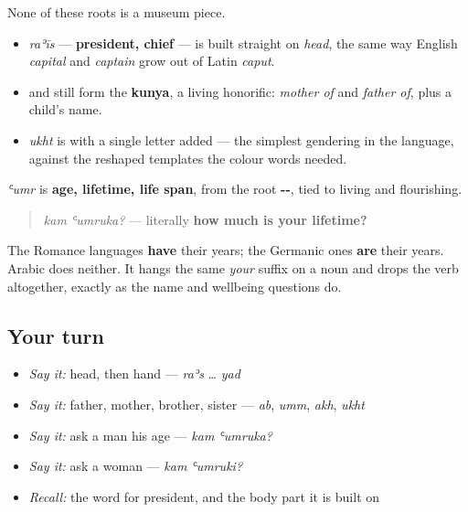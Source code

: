 \begin{tcolorbox}[breakable,skin=enhanced,colback=violet!6,colframe=violet!45!black,boxrule=0.5pt,arc=1mm,left=6pt,right=6pt,top=4pt,bottom=4pt,fonttitle=\bfseries,title={Across the family: what the roots still build}]
None of these roots is a museum piece.

\begin{itemize}
\raggedright
  \item \emph{raʾīs} — \textbf{president, chief} — is built straight on \emph{head}, the same way English \emph{capital} and \emph{captain} grow out of Latin \emph{caput}.
  \item \textbf{} and \textbf{} still form the \textbf{kunya}, a living honorific: \emph{mother of} and \emph{father of}, plus a child's name.
  \item \textbf{} \emph{ukht} is \textbf{} with a single letter added — the simplest gendering in the language, against the reshaped templates the colour words needed.
\end{itemize}
\end{tcolorbox}

\begin{grammarlens}[title={Grammar Lens: an age is a thing you own}]
\textbf{} \emph{ʿumr} is \textbf{age, lifetime, life span}, from the root \textbf{--}, tied to living and flourishing.

\begin{quote}
\textbf{ } \emph{kam ʿumruka?} — literally \textbf{how much is your lifetime?}
\end{quote}

The Romance languages \textbf{have} their years; the Germanic ones \textbf{are} their years. Arabic does neither. It hangs the same \emph{your} suffix on a noun and drops the verb altogether, exactly as the name and wellbeing questions do.
\end{grammarlens}

\subsection*{Your turn}
\begin{itemize}
\raggedright
  \item \emph{Say it:} head, then hand — \emph{raʾs} … \emph{yad}
  \item \emph{Say it:} father, mother, brother, sister — \emph{ab}, \emph{umm}, \emph{akh}, \emph{ukht}
  \item \emph{Say it:} ask a man his age — \emph{kam ʿumruka?}
  \item \emph{Say it:} ask a woman — \emph{kam ʿumruki?}
  \item \emph{Recall:} the word for president, and the body part it is built on
\end{itemize}

